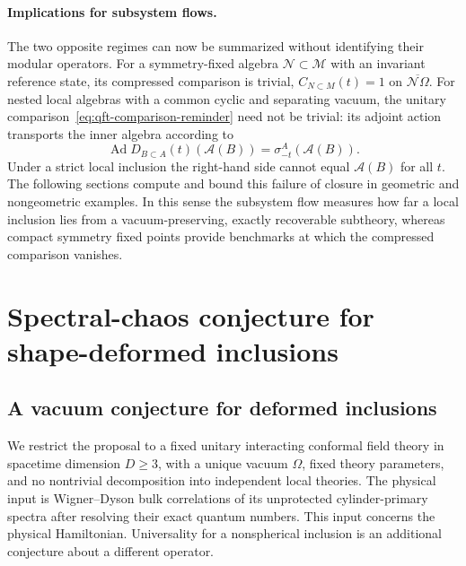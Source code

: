 \documentclass[a4paper,11pt]{article}
\theoremstyle{definition}
\begin{document}
\paragraph{Implications for subsystem flows.} 
The two opposite regimes can now be summarized without identifying
their modular operators. For a symmetry-fixed algebra
$\mathcal N\subset\mathcal M$ with an invariant reference state, its
compressed comparison is trivial,
$C_{N\subset M}(t)=1$ on $\overline{\mathcal N\Omega}$.
For nested local algebras with a common cyclic and separating vacuum,
the unitary comparison~\eqref{eq:qft-comparison-reminder} need not be
trivial: its adjoint action transports the inner algebra according to
\begin{equation}
 \operatorname{Ad}D_{B\subset A}(t)(\mathcal A(B))
   =\sigma_{-t}^{A}(\mathcal A(B)).
 \label{eq:qft-subsystem-transport}
\end{equation}
Under a strict local inclusion the right-hand side cannot equal
$\mathcal A(B)$ for all $t$. The following sections compute and bound
this failure of closure in geometric and nongeometric examples. In this
sense the subsystem flow measures how far a local inclusion lies from
a vacuum-preserving, exactly recoverable subtheory, whereas compact
symmetry fixed points provide benchmarks at which the compressed
comparison vanishes.


\section{Spectral-chaos conjecture for shape-deformed inclusions}\label{app:qft-inclusion-eth}
\subsection{A vacuum conjecture for deformed inclusions}

We restrict the proposal to a fixed unitary interacting conformal field theory in spacetime dimension $D\ge3$, with a unique vacuum $\Omega$, fixed theory parameters, and no nontrivial decomposition into independent local theories. The physical input is Wigner--Dyson bulk correlations of its unprotected cylinder-primary spectra after resolving their exact quantum numbers. This input concerns the physical Hamiltonian. Universality for a nonspherical inclusion is an additional conjecture about a different operator.
\end{document}
